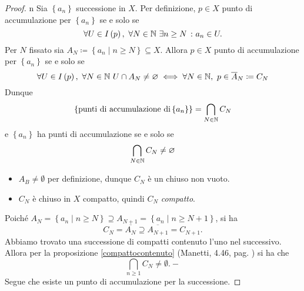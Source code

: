 \begin{proof}{n}
Sia	$\left\{a_n\right\}$ successione in $X$. Per definizione, $p\in X$ punto di accumulazione per $\left\{a_n\right\}$ se e solo se
\begin{equation*}
	\forall U\in I\left(p\right),\ \forall N\in\N\ \exists n\geq N\ \colon a_n\in U.
\end{equation*}
Per $N$ fissato sia $A_N\coloneqq \left\{a_n\mid n\geq N\right\}\subseteq X$. Allora $p\in X$ punto di accumulazione per $\displaystyle\left\{a_n\right\}$ se e solo se
\begin{equation*}
	\forall U\in I\left(p\right),\ \forall N\in\N\ U\cap A_N\neq\emptyset\iff \forall N\in\N,\ p\in\overline{A}_N\coloneqq C_N
\end{equation*}
Dunque
\begin{equation*}
	\left\{\text{punti di accumulazione di} \left\{a_n\right\}\right\}=\bigcap_{N\in\mathbb{N}}C_N
\end{equation*}
e $\left\{a_n\right\}$ ha punti di accumulazione se e solo se
 \begin{equation*}
 	 \bigcap_{N\in\mathbb{N}}C_N\neq\varnothing
 \end{equation*}
\begin{itemize}
	\item $A_B\neq \emptyset$ per definizione, dunque $C_N$ è un chiuso non vuoto.
	\item $C_N$ è chiuso in $X$ compatto, quindi $C_N$ \textit{compatto}.
\end{itemize}
Poiché $A_N=\left\{a_n\mid n\geq N\right\}\supseteq A_ {N+1}=\left\{a_n\mid n\geq N+1\right\}$, si ha
\begin{equation*}
C_N=\overline{A_N}\supseteq \overline{A_{N+1}}=C_{N+1}.
\end{equation*}
Abbiamo trovato una successione di compatti contenuto l'uno nel successivo. Allora per la proposizione \ref{compattocontenuto} (Manetti, 4.46, pag. \pageref{compattocontenuto}) si ha che
\begin{equation*}
	\bigcap_{n\geq 1}C_N\neq \emptyset.-
\end{equation*}
Segue che esiste un punto di accumulazione per la successione.\qedhere
\end{proof}
